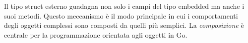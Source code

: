 \documentclass[../../../thesis.tex]{subfiles}
\begin{document}
    Il tipo struct esterno guadagna non solo i campi del tipo embedded ma anche i suoi metodi.
    Questo meccanismo è il modo principale in cui i comportamenti degli oggetti complessi sono composti da quelli più semplici.
    La \textit{composizione} è centrale per la programmazione orientata agli oggetti in Go.
\end{document}
